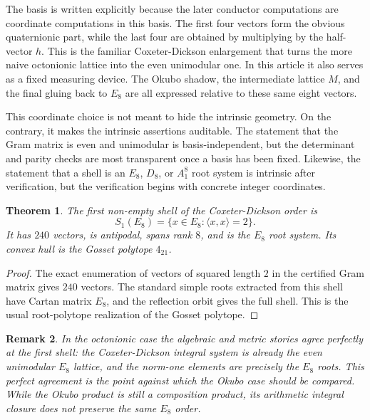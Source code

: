 \documentclass{birkjour}
\newtheorem{theorem}{Theorem}[section]
\newtheorem{remark}[theorem]{Remark}
\numberwithin{equation}{section}
\begin{document}
The basis is written explicitly because the later conductor computations are
coordinate computations in this basis. The first four vectors form the
obvious quaternionic part, while the last four are obtained by multiplying by
the half-vector \(h\). This is the familiar Coxeter-Dickson enlargement that
turns the more naive octonionic lattice into the even unimodular one. In this
article it also serves as a fixed measuring device. The Okubo shadow, the
intermediate lattice \(M\), and the final gluing back to \(E_8\) are all
expressed relative to these same eight vectors.

This coordinate choice is not meant to hide the intrinsic geometry. On the
contrary, it makes the intrinsic assertions auditable. The statement that the
Gram matrix is even and unimodular is basis-independent, but the determinant
and parity checks are most transparent once a basis has been fixed. Likewise,
the statement that a shell is an \(E_8\), \(D_8\), or \(A_1^8\) root system is
intrinsic after verification, but the verification begins with concrete
integer coordinates.

\begin{theorem}
The first non-empty shell of the Coxeter-Dickson order is
\begin{equation}
S_1(E_8)=\{x\in E_8:\langle x,x\rangle=2\}.
\end{equation}
It has \(240\) vectors, is antipodal, spans rank \(8\), and is the \(E_8\) root
system. Its convex hull is the Gosset polytope \(4_{21}\).
\end{theorem}

\begin{proof}
The exact enumeration of vectors of squared length \(2\) in the certified Gram
matrix gives \(240\) vectors. The standard simple roots extracted from this
shell have Cartan matrix \(E_8\), and the reflection orbit gives the full
shell. This is the usual root-polytope realization of the Gosset polytope.
\end{proof}

\begin{remark}
In the octonionic case the algebraic and metric stories agree perfectly at the
first shell: the Coxeter-Dickson integral system is already the even
unimodular \(E_8\) lattice, and the norm-one elements are precisely the \(E_8\)
roots. This perfect agreement is the point against which the Okubo case should
be compared. While the Okubo product is still a composition product, its
arithmetic integral closure does not preserve the same \(E_8\) order.
\end{remark}
\end{document}
